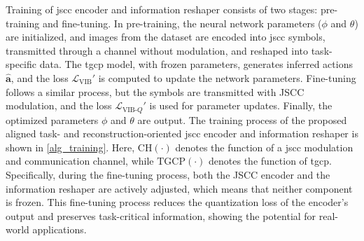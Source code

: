 Training of \gls{jscc} encoder and information reshaper consists of two stages: pre-training and fine-tuning. In pre-training, the neural network parameters (\(\phi\) and \(\theta\)) are initialized, and images from the dataset are encoded into \gls{jscc} symbols, transmitted through a channel without modulation, and reshaped into task-specific data. The \gls{tgcp} model, with frozen parameters, generates inferred actions \(\hat{\bm{a}}\), and the loss \(\mathcal{L}_{\text{VIB}}'\) is computed to update the network parameters. Fine-tuning follows a similar process, but the symbols are transmitted with JSCC modulation, and the loss \(\mathcal{L}_{\text{VIB-}Q}'\) is used for parameter updates. Finally, the optimized parameters \(\phi\) and \(\theta\) are output. The training process of the proposed aligned task- and reconstruction-oriented \gls{jscc} encoder and information reshaper is shown in \cref{alg_training}. Here, \(\text{CH}(\cdot)\) denotes the function of a \gls{jscc} modulation and communication channel, while \(\text{TGCP}(\cdot)\) denotes the function of \gls{tgcp}. Specifically, during the fine-tuning process, both the JSCC encoder and the information reshaper are actively adjusted, which means that neither component is frozen. This fine-tuning process reduces the quantization loss of the encoder's output and preserves task-critical information, showing the potential for real-world applications.





